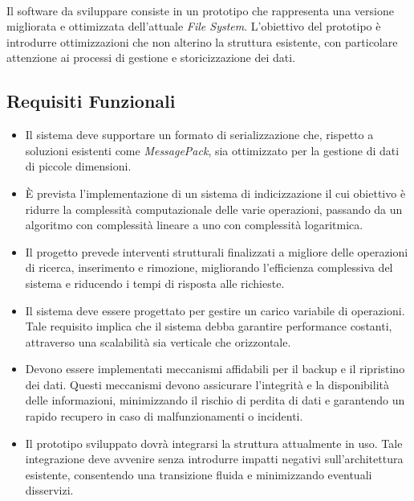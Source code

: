 \documentclass[12pt,a4paper,openright,twoside]{book}
\begin{document}
        \paragraph*{}

        Il software da sviluppare consiste in un prototipo che rappresenta una versione migliorata e ottimizzata dell'attuale \textit{File System}. L'obiettivo del prototipo è introdurre ottimizzazioni che non alterino la struttura esistente, con particolare attenzione ai processi di gestione e storicizzazione dei dati.

        \subsection{Requisiti Funzionali}

            \begin{itemize}
                \item Il sistema deve supportare un formato di serializzazione che, rispetto a soluzioni esistenti come \textit{MessagePack}, sia ottimizzato per la gestione di dati di piccole dimensioni.
                \item È prevista l’implementazione di un sistema di indicizzazione il cui obiettivo è ridurre la complessità computazionale delle varie operazioni, passando da un algoritmo con complessità lineare a uno con complessità logaritmica.
                \item Il progetto prevede interventi strutturali finalizzati a migliore delle operazioni di ricerca, inserimento e rimozione, migliorando l’efficienza complessiva del sistema e riducendo i tempi di risposta alle richieste.
                \item Il sistema deve essere progettato per gestire un carico variabile di operazioni. Tale requisito implica che il sistema debba garantire performance costanti, attraverso una scalabilità sia verticale che orizzontale.
                \item Devono essere implementati meccanismi affidabili per il backup e il ripristino dei dati. Questi meccanismi devono assicurare l’integrità e la disponibilità delle informazioni, minimizzando il rischio di perdita di dati e garantendo un rapido recupero in caso di malfunzionamenti o incidenti.
                \item Il prototipo sviluppato dovrà integrarsi la struttura attualmente in uso. Tale integrazione deve avvenire senza introdurre impatti negativi sull’architettura esistente, consentendo una transizione fluida e minimizzando eventuali disservizi.
            \end{itemize}
\end{document}
